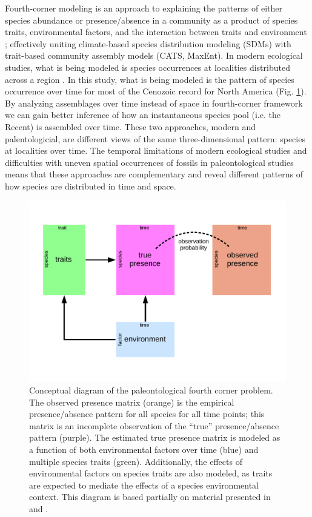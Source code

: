 \documentclass[12pt,letterpaper]{article}
\begin{document}
Fourth-corner modeling is an approach to explaining the patterns of either species abundance or presence/absence in a community as a product of species traits, environmental factors, and the interaction between traits and environment \citep{Brown2014c,Warton2015a,Pollock2012,Jamil2013}; effectively uniting climate-based species distribution modeling (SDMs) with trait-based community assembly models (CATS, MaxEnt). In modern ecological studies, what is being modeled is species occurrences at localities distributed across a region \citep{Pollock2012,Jamil2013}. In this study, what is being modeled is the pattern of species occurrence over time for most of the Cenozoic record for North America (Fig. \ref{fig:concept_fourth_corner}). By analyzing assemblages over time instead of space in fourth-corner framework we can gain better inference of how an instantaneous species pool (i.e. the Recent) is assembled over time. These two approaches, modern and palentologicial, are different views of the same three-dimensional pattern: species at localities over time. The temporal limitations of modern ecological studies and difficulties with uneven spatial occurrences of fossils in paleontological studies means that these approaches are complementary and reveal different patterns of how species are distributed in time and space.

\begin{figure}[ht]
  \centering
  \includegraphics[width=\textwidth,height=0.4\textheight,keepaspectratio=true]{figure/paleo_fourth_corner}
  \caption[Conceptual diagram of the paleontological fourth-courner problem]{Conceptual diagram of the paleontological fourth corner problem. The observed presence matrix (orange) is the empirical presence/absence pattern for all species for all time points; this matrix is an incomplete observation of the ``true'' presence/absence pattern (purple). The estimated true presence matrix is modeled as a function of both environmental factors over time (blue) and multiple species traits (green). Additionally, the effects of environmental factors on species traits are also modeled, as traits are expected to mediate the effects of a species environmental context. This diagram is based partially on material presented in \citet{Brown2014c} and \citet{Warton2015a}.}
  \label{fig:concept_fourth_corner}
\end{figure}
\end{document}
